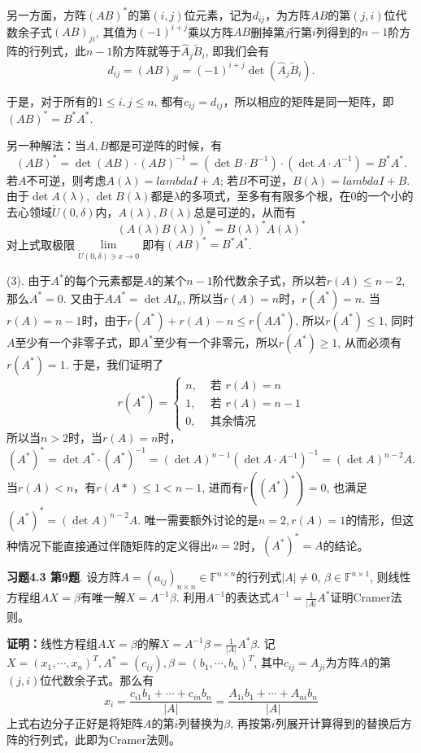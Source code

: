 另一方面，方阵$(AB)^*$的第$(i,j)$位元素，记为$d_{ij}$，为方阵$AB$的第$(j,i)$位代数余子式$(AB)_{ji}$, 其值为$(-1)^{i+j}$乘以方阵$AB$删掉第$j$行第$i$列得到的$n-1$阶方阵的行列式，此$n-1$阶方阵就等于$\widehat{A}_j \widetilde{B}_i$, 即我们会有
$$d_{ij} = (AB)_{ji} = (-1)^{i+j} \det(\widehat{A}_j \widetilde{B}_i).$$

于是，对于所有的$1\leqslant i,j \leqslant n$, 都有$c_{ij} = d_{ij}$，所以相应的矩阵是同一矩阵，即$(AB)^* = B^*A^*$.

另一种解法：当$A,B$都是可逆阵的时候，有
$$(AB)^* = \det(AB) \cdot (AB)^{-1} = (\det B \cdot B^{-1}) \cdot (\det A \cdot A^{-1}) = B^*A^*.$$
若$A$不可逆，则考虑$A(\lambda) = lambda I + A$; 若$B$不可逆，$B(\lambda) = lambda I + B$. 由于$\det A(\lambda)$, $\det B(\lambda)$都是$\lambda$的多项式，至多有有限多个根，在$0$的一个小的去心领域$\mathring{U}(0,\delta)$内，$A(\lambda), B(\lambda)$总是可逆的，从而有
$$(A(\lambda)B(\lambda))^* = B(\lambda)^*A(\lambda)^*$$
对上式取极限$\lim\limits_{\mathring{U}(0,\delta) \ni x\to 0}$即有$(AB)^* = B^*A^*$.

(3). 由于$A^*$的每个元素都是$A$的某个$n-1$阶代数余子式，所以若$r(A)\leqslant n-2$, 那么$A^* = 0$. 又由于$AA^* = \det A I_n$, 所以当$r(A) = n$时，$r(A^*) = n$. 当$r(A) = n-1$时，由于$r(A^*) + r(A) - n \leqslant r(AA^*)$, 所以$r(A^*) \leqslant 1$, 同时$A$至少有一个非零子式，即$A^*$至少有一个非零元，所以$r(A^*) \geqslant 1$, 从而必须有$r(A^*) = 1$. 于是，我们证明了
$$r(A^*) = \begin{cases} n, & \text{ 若 } r(A) = n \\ 1, & \text{ 若 } r(A) = n-1 \\ 0, & \text{ 其余情况} \end{cases}$$
所以当$n > 2$时，当$r(A) = n$时，
$$(A^*)^* = \det A^* \cdot (A^*)^{-1} = (\det A)^{n-1} (\det A \cdot A^{-1})^{-1} = (\det A)^{n-2} A.$$
当$r(A) < n$，有$r(A*) \leqslant 1 < n-1$, 进而有$r((A^*)^*) = 0$, 也满足$(A^*)^* = (\det A)^{n-2}A$. 唯一需要额外讨论的是$n=2, r(A) = 1$的情形，但这种情况下能直接通过伴随矩阵的定义得出$n = 2$时，$(A^*)^* = A$的结论。

\newpageorvspace

{\bf 习题4.3 第9题}. 设方阵$A = (a_{ij})_{n\times n} \in \mathbb{F}^{n\times n}$的行列式$|A| \neq 0$, $\beta\in\mathbb{F}^{n\times 1}$, 则线性方程组$AX=\beta$有唯一解$X = A^{-1}\beta$. 利用$A^{-1}$的表达式$A^{-1} = \frac{1}{|A|}A^*$证明Cramer法则。

{\bf 证明：}线性方程组$AX=\beta$的解$X = A^{-1}\beta = \frac{1}{|A|}A^*\beta$. 记$X = (x_1, \cdots, x_n)^T, A^* = (c_{ij}), \beta = (b_1, \cdots, b_n)^T$, 其中$c_{ij} = A_{ji}$为方阵$A$的第$(j,i)$位代数余子式。那么有
$$x_i = \frac{c_{i1}b_1 + \cdots + c_{in}b_n}{|A|} = \frac{A_{1i}b_1 + \cdots + A_{ni}b_n}{|A|}$$
上式右边分子正好是将矩阵$A$的第$i$列替换为$\beta$, 再按第$i$列展开计算得到的替换后方阵的行列式，此即为Cramer法则。


